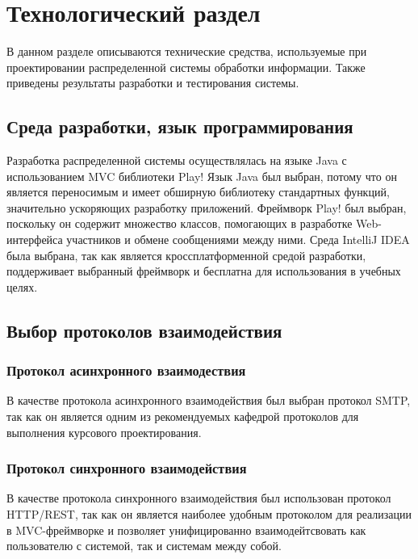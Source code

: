 \chapter{Технологический раздел}
\label{cha:impl}

В данном разделе описываются технические средства,  используемые при проектировании распределенной системы обработки информации. Также приведены результаты разработки и тестирования системы. 

\section{Среда разработки, язык программирования}
Разработка распределенной системы осуществлялась на языке Java с использованием MVC библиотеки Play!
Язык Java был выбран, потому что он является переносимым и имеет обширную библиотеку стандартных функций, значительно ускоряющих разработку приложений. Фреймворк Play! был выбран, поскольку он содержит множество классов, помогающих в разработке Web-интерфейса участников и обмене сообщениями между ними. Среда IntelliJ IDEA была выбрана, так как является кроссплатформенной средой разработки, поддерживает выбранный фреймворк и бесплатна для использования в учебных целях.

\section{Выбор протоколов взаимодействия}

\subsection{Протокол асинхронного взаимодествия}

В качестве протокола асинхронного взаимодействия был выбран протокол SMTP, так как он является одним из рекомендуемых кафедрой протоколов для выполнения курсового проектирования.

\subsection{Протокол синхронного взаимодействия}

В качестве протокола синхронного взаимодействия был использован протокол HTTP/REST, так как он является наиболее удобным протоколом для реализации в MVC-фреймворке и позволяет унифицированно взаимодейтсвовать как пользователю с системой, так и системам между собой.

